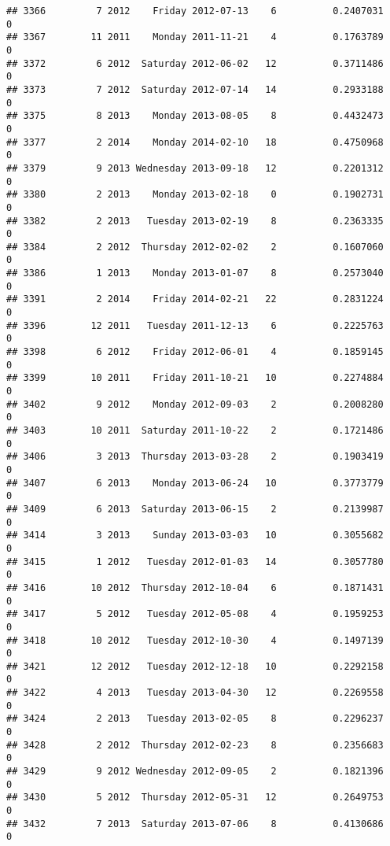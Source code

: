 \documentclass[
]{article}
\begin{document}
\begin{verbatim}
## 3366         7 2012    Friday 2012-07-13    6          0.2407031             0
## 3367        11 2011    Monday 2011-11-21    4          0.1763789             0
## 3372         6 2012  Saturday 2012-06-02   12          0.3711486             0
## 3373         7 2012  Saturday 2012-07-14   14          0.2933188             0
## 3375         8 2013    Monday 2013-08-05    8          0.4432473             0
## 3377         2 2014    Monday 2014-02-10   18          0.4750968             0
## 3379         9 2013 Wednesday 2013-09-18   12          0.2201312             0
## 3380         2 2013    Monday 2013-02-18    0          0.1902731             0
## 3382         2 2013   Tuesday 2013-02-19    8          0.2363335             0
## 3384         2 2012  Thursday 2012-02-02    2          0.1607060             0
## 3386         1 2013    Monday 2013-01-07    8          0.2573040             0
## 3391         2 2014    Friday 2014-02-21   22          0.2831224             0
## 3396        12 2011   Tuesday 2011-12-13    6          0.2225763             0
## 3398         6 2012    Friday 2012-06-01    4          0.1859145             0
## 3399        10 2011    Friday 2011-10-21   10          0.2274884             0
## 3402         9 2012    Monday 2012-09-03    2          0.2008280             0
## 3403        10 2011  Saturday 2011-10-22    2          0.1721486             0
## 3406         3 2013  Thursday 2013-03-28    2          0.1903419             0
## 3407         6 2013    Monday 2013-06-24   10          0.3773779             0
## 3409         6 2013  Saturday 2013-06-15    2          0.2139987             0
## 3414         3 2013    Sunday 2013-03-03   10          0.3055682             0
## 3415         1 2012   Tuesday 2012-01-03   14          0.3057780             0
## 3416        10 2012  Thursday 2012-10-04    6          0.1871431             0
## 3417         5 2012   Tuesday 2012-05-08    4          0.1959253             0
## 3418        10 2012   Tuesday 2012-10-30    4          0.1497139             0
## 3421        12 2012   Tuesday 2012-12-18   10          0.2292158             0
## 3422         4 2013   Tuesday 2013-04-30   12          0.2269558             0
## 3424         2 2013   Tuesday 2013-02-05    8          0.2296237             0
## 3428         2 2012  Thursday 2012-02-23    8          0.2356683             0
## 3429         9 2012 Wednesday 2012-09-05    2          0.1821396             0
## 3430         5 2012  Thursday 2012-05-31   12          0.2649753             0
## 3432         7 2013  Saturday 2013-07-06    8          0.4130686             0

\end{verbatim}
\end{document}
